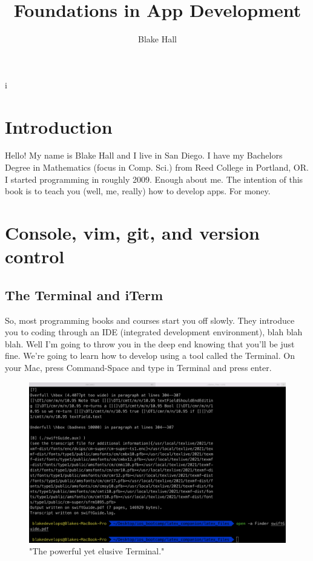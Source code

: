 \documentclass[12pt, letterpaper]{article}
\title{Foundations in App Development}
\author{Blake Hall}
\begin{document}
i
\pagecolor{myBackgroundColor} 
\color{myMainTextColor} 

\maketitle{}

\section{Introduction}

Hello! My name is Blake Hall and I live in San Diego. I have my Bachelors Degree in Mathematics (focus in Comp. Sci.)
from Reed College in Portland, OR. I started programming in roughly 2009. Enough about me. The intention of this book 
is to teach you (well, me, really) how to develop apps. For money.

\section{Console, vim, git, and version control}

\subsection*{The Terminal and iTerm}

So, most programming books and courses start you off slowly. They introduce you to coding through an IDE (integrated
development environment), blah blah blah. Well I'm going to throw you in the deep end knowing that you'll be just fine.
We're going to learn how to develop using a tool called the Terminal. On your Mac, press Command-Space and type in 
Terminal and press enter. 

\begin{figure}[ht]
    \centering
        \includegraphics[scale=.12]{terminal_screenshot}
    \caption{"The powerful yet elusive Terminal."}
\end{figure}
\end{document}
